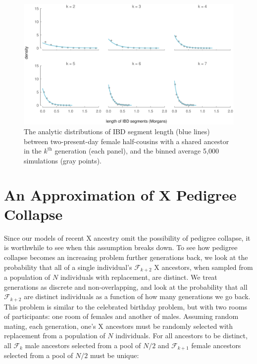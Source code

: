 \documentclass[9pt,twocolumn,twoside]{gsajnl}
\begin{document}
\begin{figure}[!ht]
  \centering
  \includegraphics[width=\textwidth]{images/x-halfcousins-blocklens}

  \caption{The analytic distributions of IBD segment length (blue lines)
  between two-present-day female half-cousins with a shared ancestor in the
  $k^\text{th}$ generation (each panel), and the binned average 5,000 simulations
  (gray points).}

\label{fig:half-cousin-x-length}

\end{figure}

\section*{An Approximation of X Pedigree Collapse}
\label{ap:ped-collapse}

Since our models of recent X ancestry omit the possibility of pedigree
collapse, it is worthwhile to see when this assumption breaks down. To see how
pedigree collapse becomes an increasing problem further generations back, we
look at the probability that all of a single individual's $\mathcal{F}_{k+2}$ X
ancestors, when sampled from a population of $N$ individuals with replacement,
are distinct. We treat generations as discrete and non-overlapping, and look at
the probability that all $\mathcal{F}_{k+2}$ are distinct individuals as a
function of how many generations we go back. This problem is similar to the
celebrated birthday problem, but with two rooms of participants: one room of
females and another of males. Assuming random mating, each generation, one's X
ancestors must be randomly selected with replacement from a population of $N$
individuals. For all ancestors to be distinct, all $\mathcal{F}_{k}$ male
ancestors selected from a pool of $N/2$ and $\mathcal{F}_{k+1}$ female
ancestors selected from a pool of $N/2$ must be unique:
\end{document}
